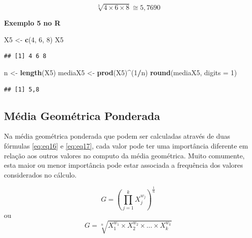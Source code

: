 \documentclass[
]{book}
\newenvironment{Shaded}{\begin{snugshade}}{\end{snugshade}}
\newcommand{\DataTypeTok}[1]{\textcolor[rgb]{0.13,0.29,0.53}{#1}}
\newcommand{\DecValTok}[1]{\textcolor[rgb]{0.00,0.00,0.81}{#1}}
\newcommand{\KeywordTok}[1]{\textcolor[rgb]{0.13,0.29,0.53}{\textbf{#1}}}
\newcommand{\NormalTok}[1]{#1}
\newcommand{\OperatorTok}[1]{\textcolor[rgb]{0.81,0.36,0.00}{\textbf{#1}}}
\newcommand{\StringTok}[1]{\textcolor[rgb]{0.31,0.60,0.02}{#1}}
\begin{document}
\begin{equation*}
  \sqrt[3]{4 \times 6 \times 8} \cong 5,7690
\end{equation*}

\textbf{Exemplo 5 no R}

\begin{Shaded}
\begin{Highlighting}[]
\NormalTok{X5 <-}\StringTok{ }\KeywordTok{c}\NormalTok{(}\DecValTok{4}\NormalTok{, }\DecValTok{6}\NormalTok{, }\DecValTok{8}\NormalTok{)}
\NormalTok{X5}
\end{Highlighting}
\end{Shaded}

\begin{verbatim}
## [1] 4 6 8
\end{verbatim}

\begin{Shaded}
\begin{Highlighting}[]
\NormalTok{n <-}\StringTok{ }\KeywordTok{length}\NormalTok{(X5)}
\NormalTok{mediaX5 <-}\StringTok{ }\KeywordTok{prod}\NormalTok{(X5)}\OperatorTok{^}\NormalTok{(}\DecValTok{1}\OperatorTok{/}\NormalTok{n)}
\KeywordTok{round}\NormalTok{(mediaX5, }\DataTypeTok{digits =} \DecValTok{1}\NormalTok{)}
\end{Highlighting}
\end{Shaded}

\begin{verbatim}
## [1] 5,8
\end{verbatim}

\hypertarget{muxe9dia-geomuxe9trica-ponderada}{%
\subsection{Média Geométrica Ponderada}\label{muxe9dia-geomuxe9trica-ponderada}}

Na média geométrica ponderada que podem ser calculadas através de duas fórmulas \eqref{eq:eq16} e \eqref{eq:eq17}, cada valor pode ter uma importância diferente em relação aos outros valores no computo da média geométrica. Muito comumente, esta maior ou menor importância pode estar associada a frequência dos valores considerados no cálculo.

\begin{equation}
    G = \left(\prod_{j=1}^{k} X_j^{w_j} \right)^{\frac{1}{n}}
    \label{eq:eq16}
\end{equation}
ou
\begin{equation}
    G = \sqrt[n]{X_1^{w_1} \times X_2^{w_2} \times \ldots \times X_k^{w_k}}
    \label{eq:eq17}
\end{equation}
\end{document}
